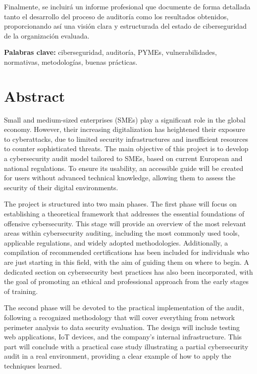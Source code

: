 \documentclass[a4paper, 10pt]{article}
\begin{document}
Finalmente, se incluirá un informe profesional que documente de forma detallada tanto el desarrollo del proceso de auditoría como los resultados obtenidos, proporcionando así una visión clara y estructurada del estado de ciberseguridad de la organización evaluada.

\par\vspace{0.5cm}
\textbf{Palabras clave:} ciberseguridad, auditoría, PYMEs, vulnerabilidades, normativas, metodologías, buenas prácticas.
\clearpage


\section*{Abstract}
\thispagestyle{empty}
Small and medium-sized enterprises (SMEs) play a significant role in the global economy. However, their increasing digitalization has heightened their exposure to cyberattacks, due to limited security infrastructures and insufficient resources to counter sophisticated threats.
The main objective of this project is to develop a cybersecurity audit model tailored to SMEs, based on current European and national regulations. To ensure its usability, an accessible guide will be created for users without advanced technical knowledge, allowing them to assess the security of their digital environments.
\par\vspace{0.5cm}

The project is structured into two main phases. The first phase will focus on establishing a theoretical framework that addresses the essential foundations of offensive cybersecurity.
This stage will provide an overview of the most relevant areas within cybersecurity auditing, including the most commonly used tools, applicable regulations, and widely adopted methodologies. Additionally, a compilation of recommended certifications has been included for individuals who are just starting in this field, with the aim of guiding them on where to begin. A dedicated section on cybersecurity best practices has also been incorporated, with the goal of promoting an ethical and professional approach from the early stages of training.
\par\vspace{0.5cm}

The second phase will be devoted to the practical implementation of the audit, following a recognized methodology that will cover everything from network perimeter analysis to data security evaluation.
The design will include testing web applications, IoT devices, and the company’s internal infrastructure.
This part will conclude with a practical case study illustrating a partial cybersecurity audit in a real environment, providing a clear example of how to apply the techniques learned.
\par\vspace{0.5cm}
\end{document}
